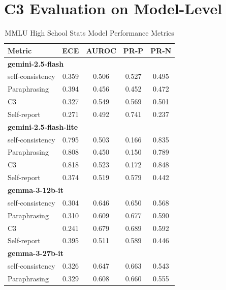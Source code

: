 \documentclass[11pt]{article}
\theoremstyle{plain}
\theoremstyle{definition}
\theoremstyle{remark}
\begin{document}
\section{C3 Evaluation on Model-Level}\label{app:model level evaluation}
\begin{table}[p]
\centering
\caption{MMLU High School Stats Model Performance Metrics}
\label{tab:model-metrics}
\scriptsize %
\begin{minipage}[t]{0.48\textwidth}
    \centering
    \begin{tabular}{lcccc}
        \toprule
        \textbf{Metric} & \textbf{ECE} & \textbf{AUROC} & \textbf{PR-P} & \textbf{PR-N} \\
        \midrule
        \multicolumn{5}{l}{\textbf{gemini-2.5-flash}} \\
        self-consistency & 0.359 & 0.506 & 0.527 & 0.495 \\
        Paraphrasing     & 0.394 & 0.456 & 0.452 & 0.472 \\
        C3              & 0.327 & 0.549 & 0.569 & 0.501 \\
        Self-report      & 0.271 & 0.492 & 0.741 & 0.237 \\
        \midrule
        \multicolumn{5}{l}{\textbf{gemini-2.5-flash-lite}} \\
        self-consistency & 0.795 & 0.503 & 0.166 & 0.835 \\
        Paraphrasing     & 0.808 & 0.450 & 0.150 & 0.789 \\
        C3            & 0.818 & 0.523 & 0.172 & 0.848 \\
        Self-report      & 0.374 & 0.519 & 0.579 & 0.442 \\
        \midrule
        \multicolumn{5}{l}{\textbf{gemma-3-12b-it}} \\
        self-consistency & 0.304 & 0.646 & 0.650 & 0.568 \\
        Paraphrasing     & 0.310 & 0.609 & 0.677 & 0.590 \\
        C3            & 0.241 & 0.679 & 0.689 & 0.592 \\
        Self-report      & 0.395 & 0.511 & 0.589 & 0.446 \\
        \midrule
        \multicolumn{5}{l}{\textbf{gemma-3-27b-it}} \\
        self-consistency & 0.326 & 0.647 & 0.663 & 0.543 \\
        Paraphrasing     & 0.329 & 0.608 & 0.660 & 0.555 \\

\end{tabular}
\end{minipage}
\end{table}
\end{document}
